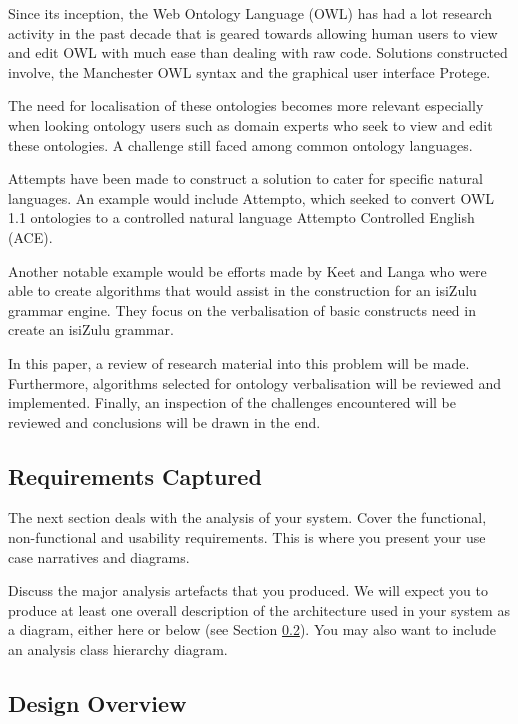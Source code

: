 \documentclass[11pt,a4paper]{article}
\begin{document}
Since its inception, the Web Ontology Language (OWL) has had a lot research 
activity in the past decade that is geared towards allowing human users to 
view and edit OWL with much ease than dealing with raw code. Solutions 
constructed involve, the Manchester OWL syntax %
and the graphical user interface Protege. %

The need for localisation of these ontologies becomes more relevant especially
when looking ontology users such as domain experts who seek to view and edit
these ontologies. A challenge still faced among common ontology languages. %

Attempts have been made to construct a solution to cater for specific natural 
languages. An example would include Attempto, which seeked to convert OWL 1.1 
ontologies to a controlled natural language Attempto Controlled English (ACE).

Another notable example would be efforts made by Keet and Langa who were able
to create algorithms that would assist in the construction for an isiZulu 
grammar engine. They focus on the verbalisation of basic constructs need in
create an isiZulu grammar. %

In this paper, a review of research material into this problem will be made. 
Furthermore, algorithms selected for ontology verbalisation will be reviewed and
implemented. Finally, an inspection of the challenges encountered will be reviewed
and conclusions will be drawn in the end.

\subsection{Requirements Captured}

The next section deals with the analysis of your system. Cover the
functional, non-functional and usability requirements. This is where
you present your use case narratives and diagrams. 

Discuss the major analysis artefacts that you produced. We will expect
you to produce at least one overall description of the architecture
used in your system as a diagram, either here or below (see Section
\ref{ss:design-overview}). You may also want to include an analysis
class hierarchy diagram.

\subsection{Design Overview}
\label{ss:design-overview}
\end{document}
